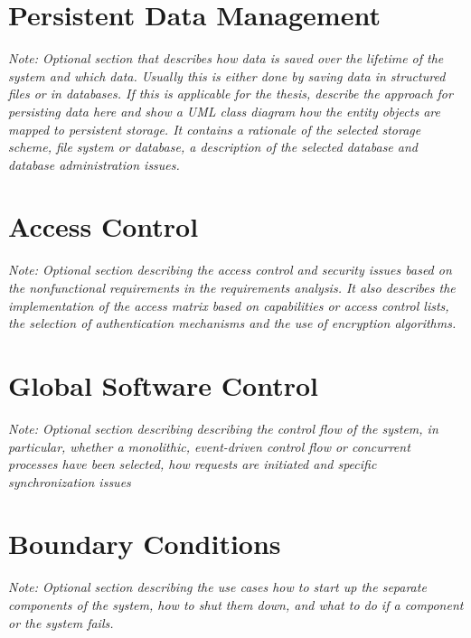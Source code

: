 \documentclass[a4paper,12pt,twoside]{report}
\begin{document}
\section{Persistent Data Management}

\textit{Note: Optional section that describes how data is saved over the lifetime of the system and which data. Usually this is either done by saving data in structured files or in databases. If this is applicable for the thesis, describe the approach for persisting data here and show a UML class diagram how the entity objects are mapped to persistent storage.
It contains a rationale of the selected storage scheme, file system or database, a description of the selected database and database administration issues.}

\section{Access Control}

\textit{Note: Optional section describing the access control and security issues based on the nonfunctional requirements in the requirements analysis. It also describes the implementation of the access matrix based on capabilities or access control lists, the selection of  authentication mechanisms and the use of encryption algorithms.}

\section{Global Software Control}

\textit{Note: Optional section describing describing the control flow of the system, in particular, whether a monolithic, event-driven control flow or concurrent processes have been selected, how requests are initiated and specific synchronization issues}


\section{Boundary Conditions}

\textit{Note: Optional section describing the use cases how to start up the separate components of the system, how to shut them down, and what to do if a component or the system fails.}










\end{document}
